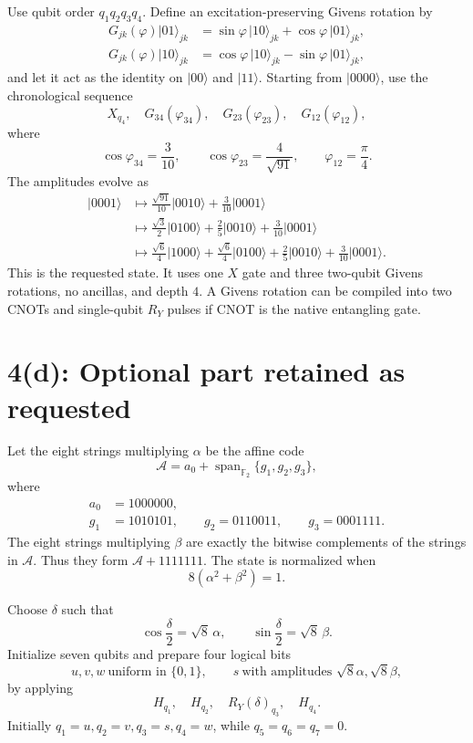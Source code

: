 \documentclass[11pt]{article}
\newcommand{\ket}[1]{\lvert #1\rangle}
\begin{document}
Use qubit order \(q_1q_2q_3q_4\). Define an excitation-preserving Givens
rotation by
\[
\begin{aligned}
G_{jk}(\varphi)\ket{01}_{jk}
 &=\sin\varphi\,\ket{10}_{jk}
  +\cos\varphi\,\ket{01}_{jk},\\
G_{jk}(\varphi)\ket{10}_{jk}
 &=\cos\varphi\,\ket{10}_{jk}
  -\sin\varphi\,\ket{01}_{jk},
\end{aligned}
\]
and let it act as the identity on \(\ket{00}\) and \(\ket{11}\).
Starting from \(\ket{0000}\), use the chronological sequence
\[
 X_{q_4},\quad
 G_{34}(\varphi_{34}),\quad
 G_{23}(\varphi_{23}),\quad
 G_{12}(\varphi_{12}),
\]
where
\[
 \cos\varphi_{34}=\frac{3}{10},\qquad
 \cos\varphi_{23}=\frac{4}{\sqrt{91}},\qquad
 \varphi_{12}=\frac{\pi}{4}.
\]
The amplitudes evolve as
\begin{align*}
\ket{0001}
&\longmapsto
\frac{\sqrt{91}}{10}\ket{0010}
+\frac{3}{10}\ket{0001}\\
&\longmapsto
\frac{\sqrt3}{2}\ket{0100}
+\frac25\ket{0010}
+\frac{3}{10}\ket{0001}\\
&\longmapsto
\frac{\sqrt6}{4}\ket{1000}
+\frac{\sqrt6}{4}\ket{0100}
+\frac25\ket{0010}
+\frac{3}{10}\ket{0001}.
\end{align*}
This is the requested state. It uses one \(X\) gate and three two-qubit
Givens rotations, no ancillas, and depth \(4\). A Givens rotation can be
compiled into two CNOTs and single-qubit \(R_Y\) pulses if CNOT is the
native entangling gate.

\section*{4(d): Optional part retained as requested}

Let the eight strings multiplying \(\alpha\) be the affine code
\[
 \mathcal A
 =a_0+\operatorname{span}_{\mathbb F_2}\{g_1,g_2,g_3\},
\]
where
\[
\begin{aligned}
a_0&=1000000,\\
g_1&=1010101,\qquad
g_2=0110011,\qquad
g_3=0001111.
\end{aligned}
\]
The eight strings multiplying \(\beta\) are exactly the bitwise
complements of the strings in \(\mathcal A\). Thus they form
\(\mathcal A+1111111\). The state is normalized when
\[
 8(\alpha^2+\beta^2)=1.
\]

Choose \(\delta\) such that
\[
 \cos\frac{\delta}{2}=\sqrt8\,\alpha,\qquad
 \sin\frac{\delta}{2}=\sqrt8\,\beta.
\]
Initialize seven qubits and prepare four logical bits
\[
 u,v,w\ \text{uniform in }\{0,1\},
 \qquad
 s\ \text{with amplitudes }\sqrt8\alpha,\sqrt8\beta,
\]
by applying
\[
 H_{q_1},\quad H_{q_2},\quad R_Y(\delta)_{q_3},\quad H_{q_4}.
\]
Initially \(q_1=u,q_2=v,q_3=s,q_4=w\), while \(q_5=q_6=q_7=0\).
\end{document}
